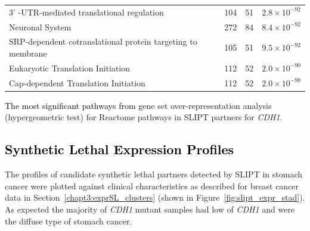 \begin{table}[!htbp]
{\begin{threeparttable}
\begin{tabular}{lccc}
  3' -UTR-mediated translational regulation & 104 &  51 & $2.8 \times 10^{-92}$ \\ 
  \rowcolor{black!10}
  Neuronal System & 272 &  84 & $8.4 \times 10^{-92}$ \\ 
  \rowcolor{black!5}
  SRP-dependent cotranslational protein targeting to membrane & 105 &  51 & $9.5 \times 10^{-92}$ \\ 
  \rowcolor{black!10}
  Eukaryotic Translation Initiation & 112 &  52 & $2.0 \times 10^{-90}$ \\ 
  \rowcolor{black!5}
  Cap-dependent Translation Initiation & 112 &  52 & $2.0 \times 10^{-90}$ \\ 
   \hline
\end{tabular}
\begin{tablenotes}
\raggedright %
\textcolor{black}{The most significant pathways from g}ene set over-representation analysis (hypergeometric test) for Reactome pathways in \gls{SLIPT} partners for \textit{CDH1}.
\end{tablenotes}
\end{threeparttable}
}
\end{table}




\subsection{\textcolor{black}{Synthetic Lethal Expression Profiles}} \label{chapt3:stad_SL_clusters}

The  profiles of candidate \gls{synthetic lethal} partners detected by \gls{SLIPT} in stomach cancer were plotted against clinical characteristics as described for breast cancer data in Section~\ref{chapt3:exprSL_clusters} (shown in Figure~\ref{fig:slipt_expr_stad}). As expected the majority of \textit{CDH1} \gls{mutant} samples had low  of \textit{CDH1} and were the diffuse type of stomach cancer.

